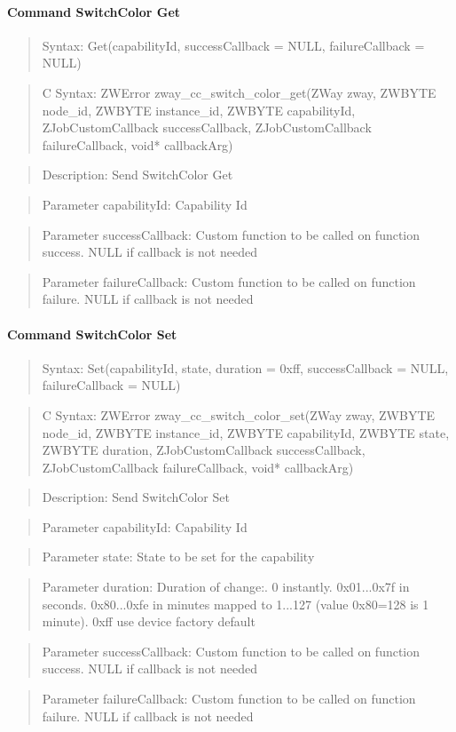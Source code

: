 \paragraph{Command SwitchColor Get}
\begin{quote}Syntax: Get(capabilityId, successCallback = NULL, failureCallback = NULL)\end{quote}
\begin{quote}C Syntax: ZWError zway\_cc\_switch\_color\_get(ZWay zway, ZWBYTE node\_id, ZWBYTE instance\_id, ZWBYTE capabilityId, ZJobCustomCallback successCallback, ZJobCustomCallback failureCallback, void* callbackArg)\end{quote}
\begin{quote}Description: Send SwitchColor Get\end{quote}
\begin{quote}Parameter capabilityId: Capability Id\end{quote}
\begin{quote}Parameter successCallback: Custom function to be called on function success. NULL if callback is not needed\end{quote}
\begin{quote}Parameter failureCallback: Custom function to be called on function failure. NULL if callback is not needed\end{quote}


\paragraph{Command SwitchColor Set}
\begin{quote}Syntax: Set(capabilityId, state, duration = 0xff, successCallback = NULL, failureCallback = NULL)\end{quote}
\begin{quote}C Syntax: ZWError zway\_cc\_switch\_color\_set(ZWay zway, ZWBYTE node\_id, ZWBYTE instance\_id, ZWBYTE capabilityId, ZWBYTE state, ZWBYTE duration, ZJobCustomCallback successCallback, ZJobCustomCallback failureCallback, void* callbackArg)\end{quote}
\begin{quote}Description: Send SwitchColor Set\end{quote}
\begin{quote}Parameter capabilityId: Capability Id\end{quote}
\begin{quote}Parameter state: State to be set for the capability\end{quote}
\begin{quote}Parameter duration: Duration of change:. 0 instantly. 0x01...0x7f in seconds. 0x80...0xfe in minutes mapped to 1...127 (value 0x80=128 is 1 minute). 0xff use device factory default\end{quote}
\begin{quote}Parameter successCallback: Custom function to be called on function success. NULL if callback is not needed\end{quote}
\begin{quote}Parameter failureCallback: Custom function to be called on function failure. NULL if callback is not needed\end{quote}


